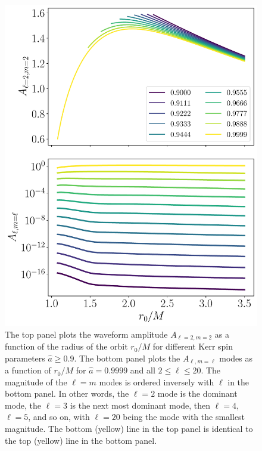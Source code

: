 \documentclass[%
 reprint,
 nofootinbib,
 amsmath,amssymb,
 aps,
 prd,
]{revtex4-2}
\begin{document}
\begin{figure}[!htp]
    \centering
    \includegraphics[width=0.95\linewidth]{figures/amp_combined.pdf}
    \caption{The top panel plots the waveform amplitude $A_{\ell=2, m=2}$ as a function of the radius of the orbit $r_0/M$ for different Kerr spin parameters $\hat{a}\geq 0.9$. The bottom panel plots the $A_{\ell, m=\ell}$ modes as a function of $r_0/M$ for $\hat{a} = 0.9999$ and all $2 \leq \ell \leq 20$. The magnitude of the $\ell = m$ modes is ordered inversely with $\ell$ in the bottom panel. In other words, the $\ell = 2$ mode is the dominant mode, the $\ell = 3$ is the next most dominant mode, then $\ell =4$, $\ell = 5$, and so on, with $\ell = 20$ being the mode with the smallest magnitude. The bottom (yellow) line in the top panel is identical to the top (yellow) line in the bottom panel.}
    \label{fig:amplitudeVariation}
\end{figure}
\end{document}
